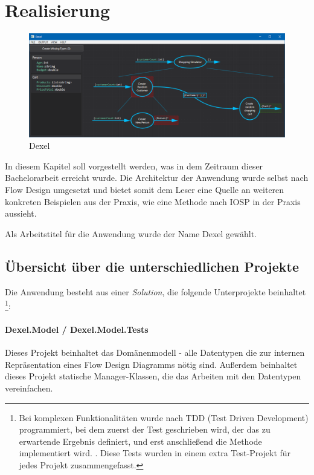


\chapter{Realisierung }

	\begin{figure}[H]
		\centering
		\includegraphics[width=1\linewidth]{./img/Dexel.png} 
		\caption{Dexel}
	\end{figure}



In diesem Kapitel soll vorgestellt werden, was in dem Zeitraum dieser
Bachelorarbeit erreicht wurde. Die Architektur der Anwendung wurde selbst nach
Flow Design umgesetzt und bietet somit dem Leser eine Quelle an weiteren
konkreten Beispielen aus der Praxis, wie eine Methode nach IOSP in der Praxis aussieht.

Als Arbeitstitel für die Anwendung wurde der Name Dexel gewählt.

\section{Übersicht über die unterschiedlichen Projekte}

Die Anwendung besteht aus einer \textit{Solution}, die folgende Unterprojekte beinhaltet \footnote{Bei komplexen Funktionalitäten wurde nach TDD (Test Driven Development)
programmiert, bei dem zuerst der Test geschrieben wird, der das zu erwartende
Ergebnis definiert, und erst anschließend die Methode implementiert wird.
. Diese Tests wurden in einem extra Test-Projekt für jedes Projekt zusammengefasst.}:

\subsubsection{Dexel.Model / Dexel.Model.Tests}

Dieses Projekt beinhaltet das Domänenmodell - alle Datentypen die zur internen Repräsentation
eines Flow Design Diagramms nötig sind. Außerdem beinhaltet dieses Projekt
statische Manager-Klassen, die das Arbeiten mit den Datentypen vereinfachen.


